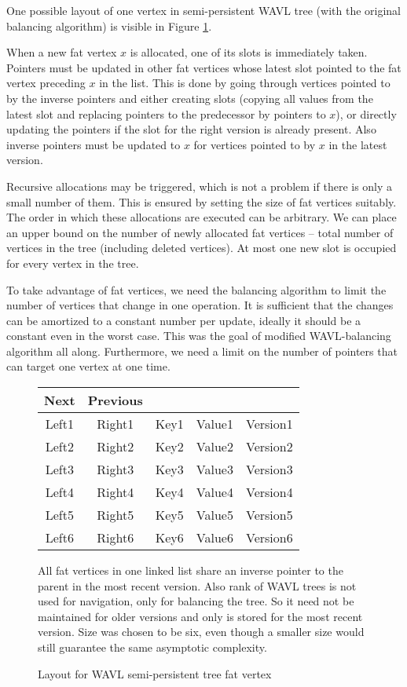 One possible layout of one vertex in semi-persistent WAVL tree (with the original balancing algorithm) is visible in Figure \ref{fig:semi-layout}.

When a new fat vertex $x$ is allocated, one of its slots is immediately taken. 
Pointers must be updated in other fat vertices whose latest slot pointed to the fat vertex preceding $x$ in the list. 
This is done by going through vertices pointed to by the inverse pointers and either creating slots (copying all values from the latest slot and replacing pointers to the predecessor by pointers to $x$), or directly updating the pointers if the slot for the right version is already present. 
Also inverse pointers must be updated to $x$ for vertices pointed to by $x$ in the latest version.

Recursive allocations may be triggered, which is not a problem if there is only a small number of them. 
This is ensured by setting the size of fat vertices suitably. 
The order in which these allocations are executed can be arbitrary.
We can place an upper bound on the number of newly allocated fat vertices -- total number of vertices in the tree (including deleted vertices). 
At most one new slot is occupied for every vertex in the tree.

To take advantage of fat vertices, we need the balancing algorithm to limit the number of vertices that change in one operation. 
It is sufficient that the changes can be amortized to a constant number per update, ideally it should be a constant even in the worst case.
This was the goal of modified WAVL-balancing algorithm all along. 
Furthermore, we need a limit on the number of pointers that can target one vertex at one time.

\begin{figure}
	\begin{center}
		\ttfamily
		\begin{tabular}{ccccc}
			Next  & Previous &      &        &          \\ \hline
			Left1 &  Right1  & Key1 & Value1 & Version1 \\ \hline
			Left2 &  Right2  & Key2 & Value2 & Version2 \\ \hline
			Left3 &  Right3  & Key3 & Value3 & Version3 \\ \hline
			Left4 &  Right4  & Key4 & Value4 & Version4 \\ \hline
			Left5 &  Right5  & Key5 & Value5 & Version5 \\ \hline
			Left6 &  Right6  & Key6 & Value6 & Version6 \\ \hline
		\end{tabular}
	\end{center}
{
\small
All fat vertices in one linked list share an inverse pointer to the parent in the most recent version. Also rank of WAVL trees is not used for navigation, only for balancing the tree. So it need not be maintained for older versions and only is stored for the most recent version. Size was chosen to be six, even though a smaller size would still guarantee the same asymptotic complexity.
}
\caption{Layout for WAVL semi-persistent tree fat vertex}
\label{fig:semi-layout}
\end{figure}

